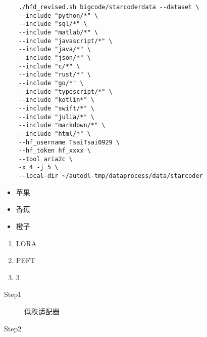 \documentclass{article}
\begin{document}
\begin{verbatim}
    ./hfd_revised.sh bigcode/starcoderdata --dataset \
    --include "python/*" \
    --include "sql/*" \
    --include "matlab/*" \
    --include "javascript/*" \
    --include "java/*" \
    --include "json/*" \
    --include "c/*" \
    --include "rust/*" \
    --include "go/*" \
    --include "typescript/*" \
    --include "kotlin*" \
    --include "swift/*" \
    --include "julia/*" \
    --include "markdown/*" \
    --include "html/*" \
    --hf_username TsaiTsai0929 \
    --hf_token hf_xxxx \
    --tool aria2c \
    -x 4 -j 5 \
    --local-dir ~/autodl-tmp/dataprocess/data/starcoder
\end{verbatim}

\begin{itemize}
    \item 苹果
    \item 香蕉
    \item 橙子
\end{itemize}

\begin{enumerate}
    \item LORA
    \item PEFT
    \item 3
\end{enumerate}
\begin{description}
    \item[Step1] 低秩适配器  
    \item[Step2]     
\end{description}
\end{document}
